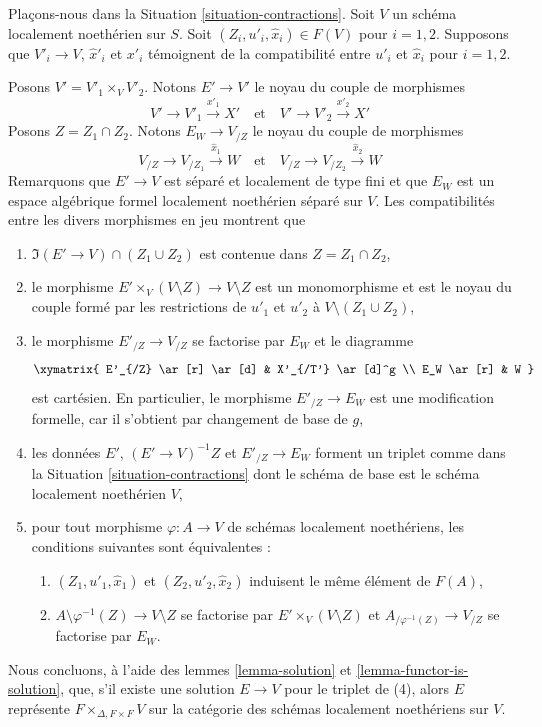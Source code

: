 \begin{remark}
\label{remark-diagonal}
Plaçons-nous dans la Situation \ref{situation-contractions}.
Soit $V$ un schéma localement noethérien sur $S$.
Soit $(Z_i, u'_i, \hat x_i) \in F(V)$ pour $i = 1, 2$. Supposons que $V'_i \to V$,
$\hat x'_i$ et $x'_i$ témoignent de la compatibilité entre $u'_i$ et
$\hat x_i$ pour $i = 1, 2$.

\medskip\noindent
Posons $V' = V'_1 \times_V V'_2$. Notons $E' \to V'$ le noyau du couple
de morphismes
$$
V' \to V'_1 \xrightarrow{x'_1} X'
\quad\text{et}\quad
V' \to V'_2 \xrightarrow{x'_2} X'
$$
Posons $Z = Z_1 \cap Z_2$. Notons $E_W \to V_{/Z}$
le noyau du couple de morphismes
$$
V_{/Z} \to V_{/Z_1} \xrightarrow{\hat x_1} W
\quad\text{et}\quad
V_{/Z} \to V_{/Z_2} \xrightarrow{\hat x_2} W
$$
Remarquons que $E' \to V$ est séparé et localement de type fini
et que $E_W$ est un espace algébrique formel localement noethérien
séparé sur $V$.
Les compatibilités entre les divers morphismes en jeu montrent que
\begin{enumerate}
\item $\Im(E' \to V) \cap (Z_1 \cup Z_2)$
est contenue dans $Z = Z_1 \cap Z_2$,
\item le morphisme $E' \times_V (V \setminus Z) \to V \setminus Z$
est un monomorphisme et est le noyau du couple formé par les restrictions
de $u'_1$ et $u'_2$ à $V \setminus (Z_1 \cup Z_2)$,
\item le morphisme $E'_{/Z} \to V_{/Z}$ se factorise par $E_W$
et le diagramme
$$
\xymatrix{
E'_{/Z} \ar[r] \ar[d] & X'_{/T'} \ar[d]^g \\
E_W \ar[r] & W
}
$$
est cartésien. En particulier, le morphisme $E'_{/Z} \to E_W$
est une modification formelle, car il s'obtient par changement de base de $g$,
\item les données $E'$, $(E' \to V)^{-1}Z$ et $E'_{/Z} \to E_W$
forment un triplet comme dans la Situation \ref{situation-contractions}
dont le schéma de base est le schéma localement noethérien $V$,
\item pour tout morphisme $\varphi : A \to V$
de schémas localement noethériens, les conditions suivantes sont équivalentes :
\begin{enumerate}
\item $(Z_1, u'_1, \hat x_1)$ et $(Z_2, u'_2, \hat x_2)$
induisent le même élément de $F(A)$,
\item $A \setminus \varphi^{-1}(Z) \to V \setminus Z$
se factorise par $E' \times_V (V \setminus Z)$
et $A_{/\varphi^{-1}(Z)} \to V_{/Z}$
se factorise par $E_W$.
\end{enumerate}
\end{enumerate}
Nous concluons, à l'aide des
lemmes \ref{lemma-solution} et \ref{lemma-functor-is-solution},
que, s'il existe une solution $E \to V$
pour le triplet de (4), alors $E$ représente
$F \times_{\Delta, F \times F} V$ sur la catégorie des
schémas localement noethériens sur $V$.
\end{remark}

